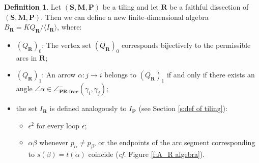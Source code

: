 \documentclass[a4paper,10pt]{amsart}
\theoremstyle{plain}          %
\theoremstyle{definition}
\newtheorem{definition}[theorem]{Definition}
\def\SS{\mathbf{S}}
\def\MM{\mathbf{M}}
\def\ba{\mathbf{a}}
\def\PP{\mathbf{P}}
\def\MM{\mathbf{M}}
\newcommand{\ha}{\angle^-}
\begin{document}
\begin{definition}\label{d:definition of A_R}
    Let $(\SS,\MM,\PP)$ be a tiling and let $\mathbf{R}$ be a faithful dissection of $(\SS,\MM,\PP)$. Then we can define a new finite-dimensional algebra $B_{\mathbf{R}}=KQ_{\mathbf{R}}/\langle I_{\mathbf{R}}\rangle $,
where:
\begin{itemize}
    \item $(Q_{\mathbf{R}})_0$: The vertex set $({Q}_{\mathbf{R}})_0$ corresponds bijectively to the permissible arcs in  $\mathbf{R}$;
     \item $(Q_{\mathbf{R}})_1$: An arrow $\alpha: j \to i$ belongs to $(Q_{\mathbf{R}})_1$ if and only if there exists an angle $\angle\alpha\in\ha_{\textbf{PR-free}}(\gamma_i,\gamma_j)$;
     

 
    \item the set $I_{\mathbf{R}}$ is defined analogously to $I_{\PP}$ (see Section \ref{s:def of tiling}): \begin{itemize}
        \item $\epsilon^2$ for every loop $\epsilon$;
        \item $\alpha\beta$ whenever $p_\alpha\neq p_\beta$, or the endpoints of the arc segment corresponding to $s(\beta)=t(\alpha)$ coincide ({\em cf.} Figure \ref{f:A_R algebra}).
    \end{itemize}
    
  \begin{figure}[h]
\begin{tikzpicture}


\end{tikzpicture}
\end{figure}
\end{itemize}
\end{definition}
\end{document}
